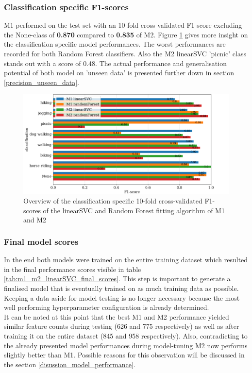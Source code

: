 \subsubsection{Classification specific F1-scores}
M1 performed on the test set with an 10-fold cross-validated F1-score excluding the None-class of \textbf{0.870} compared to \textbf{0.835} of M2. Figure \ref{fig:m1_m2_class_f1_scores} gives more insight on the classification specific model performances. The worst performances are recorded for both Random Forest classifiers. Also the M2 linearSVC 'picnic' class stands out with a score of 0.48. The actual performance and generalisation potential of both model on 'unseen data' is presented further down in section \ref{precision_unseen_data}.

\begin{figure}[!htb]
   \centering
   \includegraphics[width=\textwidth]{img/m1_m2_class_f1_scores_bigger_font.pdf}
   \caption{Overview of the classification specific 10-fold cross-validated F1-scores of the linearSVC and Random Forest fitting algorithm of M1 and M2}
   \label{fig:m1_m2_class_f1_scores}
\end{figure}

\subsubsection{Final model scores}
In the end both models were trained on the entire training dataset which resulted in the final performance scores visible in table \ref{tab:m1_m2_linearSVC_final_scores}. This step is important to generate a finalised model that is eventually trained on as much training data as possible. Keeping a data aside for model testing is no longer necessary because the most well performing hyperparameter configuration is already determined.\\
It can be noted at this point that the best M1 and M2 performance yielded similar feature counts during testing (626 and 775 respectively) as well as after training it on the entire dataset (845 and 958 respectively). Also, contradicting to the already presented model performances during model-tuning M2 now performs slightly better than M1. Possible reasons for this observation will be discussed in the section \ref{disussion_model_performance}.

